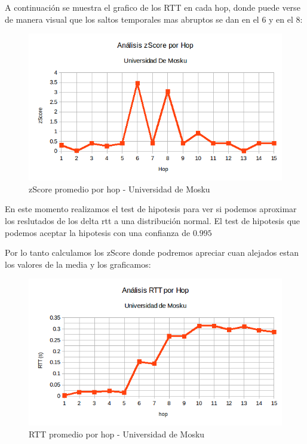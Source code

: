 A continuación se muestra el grafico de los RTT en cada hop, donde puede verse de manera visual que los saltos temporales mas abruptos se dan en 
el 6 y en el 8:

\bigskip

\begin{figure}[H]
\centering
\includegraphics[width=1\textwidth]{graficos/zScore_rus.png}
\caption{zScore promedio por hop - Universidad de Mosku}
\label{Rus_zs}
\end{figure}

En este momento realizamos el test de hipotesis para ver si podemos aproximar los reslutados de los delta rtt a una distribución normal. 
El test de hipotesis que podemos aceptar la hipotesis con una confianza de $0.995$

Por lo tanto calculamos los zScore donde podremos apreciar cuan alejados estan los valores de la media y los graficamos:

\begin{figure}[H]
\centering
\includegraphics[width=1\textwidth]{graficos/RTT_rus.png}
\caption{RTT promedio por hop - Universidad de Mosku}
\label{Rus_rtt}
\end{figure}


